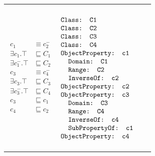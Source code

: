 \documentclass[11pt,final,onecolumn]{report}
\newcommand\dltablespacing{4.5cm}
\newcommand\owlspacing{-1mm}
\begin{document}
\begin{longtable}{|>{\scriptsize}c|>{\scriptsize}l|>{\scriptsize}l|}
\begin{minipage}{\dltablespacing}
       $\begin{aligned}    	  
    	c_1 &\equiv c_2^-\\ 
    	\exists c_1.\top &\sqsubseteq C_1\\
    	\exists c_1^-.\top &\sqsubseteq C_2\\
    	c_3 &\equiv c_4^-\\
    	\exists c_3.\top &\sqsubseteq C_3\\
    	\exists c_3^-.\top &\sqsubseteq C_4\\    	
    	c_3 &\sqsubseteq c_1\\
    	c_4 &\sqsubseteq c_2  
         \end{aligned}$      
    \end{minipage}
    &
      $\begin{aligned}
        \\
        &\texttt{Class: C1}\\[\owlspacing]
        &\texttt{Class: C2}\\[\owlspacing]
        &\texttt{Class: C3}\\[\owlspacing]
        &\texttt{Class: C4}\\[\owlspacing]
   	&\texttt{ObjectProperty: c1}\\[\owlspacing]
   	&\texttt{\hspace*{0.20cm} Domain: C1}\\[\owlspacing]
   	&\texttt{\hspace*{0.20cm} Range: C2}\\[\owlspacing]
   	&\texttt{\hspace*{0.20cm} InverseOf: c2}\\[\owlspacing]
   	&\texttt{ObjectProperty: c2}\\[\owlspacing]
   	&\texttt{ObjectProperty: c3}\\[\owlspacing]
   	&\texttt{\hspace*{0.20cm} Domain: C3}\\[\owlspacing]
   	&\texttt{\hspace*{0.20cm} Range: C4}\\[\owlspacing]
   	&\texttt{\hspace*{0.20cm} InverseOf: c4}\\[\owlspacing] 
    	&\texttt{\hspace*{0.20cm} SubPropertyOf: c1}\\[\owlspacing]
    	&\texttt{ObjectProperty: c4}\\[\owlspacing]
   	\\
     \end{aligned}$       

\end{longtable}
\end{document}
